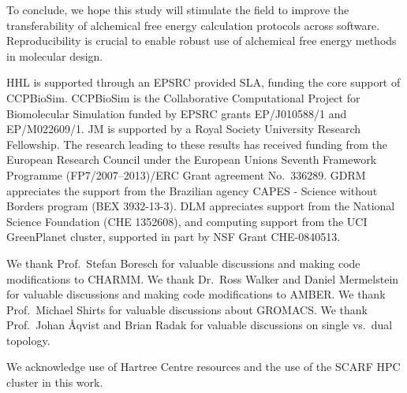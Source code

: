 \documentclass[journal=jctcce,manuscript=article]{achemso}
\begin{document}
To conclude, we hope this study will stimulate the field to improve the transferability of alchemical free energy calculation protocols across software.  Reproducibility is crucial to enable robust use of alchemical free energy methods in molecular design.




\begin{acknowledgement}
  HHL is supported through an EPSRC provided SLA, funding the core
  support of CCPBioSim.  CCPBioSim is the Collaborative Computational
  Project for Biomolecular Simulation funded by EPSRC grants
  EP/J010588/1 and EP/M022609/1.  JM is supported by a Royal Society
  University Research Fellowship.  The research leading to these
  results has received funding from the European Research Council
  under the European Unions Seventh Framework Programme
  (FP7/2007--2013)/ERC Grant agreement No.\ 336289.  GDRM appreciates
  the support from the Brazilian agency CAPES - Science without
  Borders program (BEX 3932-13-3).  DLM appreciates support from the
  National Science Foundation (CHE 1352608), and computing support
  from the UCI GreenPlanet cluster, supported in part by NSF Grant
  CHE-0840513.

  We thank Prof.\ Stefan Boresch for valuable discussions and making code
  modifications to CHARMM.  We thank Dr.\ Ross Walker and Daniel Mermelstein
  for valuable discussions and making code modifications to AMBER.  We thank
  Prof.\ Michael Shirts for valuable discussions about GROMACS.  We thank
  Prof.\ Johan \AA{}qvist and Brian Radak for valuable discussions on single
  vs.\ dual topology.

  We acknowledge use of Hartree Centre resources and the use of the
  SCARF HPC cluster in this work.
\end{acknowledgement}



\end{document}
